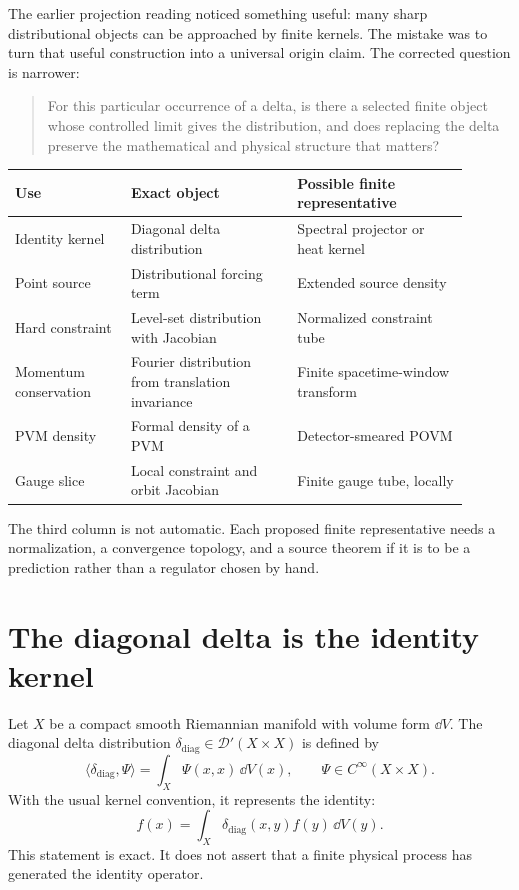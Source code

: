 \documentclass[11pt]{article}
\newcommand{\Dcal}{\mathcal D}
\begin{document}
The earlier projection reading noticed something useful: many sharp
distributional objects can be approached by finite kernels. The mistake was
to turn that useful construction into a universal origin claim. The corrected
question is narrower:
\begin{quote}
For this particular occurrence of a delta, is there a selected finite object
whose controlled limit gives the distribution, and does replacing the delta
preserve the mathematical and physical structure that matters?
\end{quote}

\begin{center}
\begin{tabular}{p{0.23\linewidth}p{0.33\linewidth}p{0.34\linewidth}}
\toprule
Use & Exact object & Possible finite representative\\
\midrule
Identity kernel &
Diagonal delta distribution &
Spectral projector or heat kernel\\
Point source &
Distributional forcing term &
Extended source density\\
Hard constraint &
Level-set distribution with Jacobian &
Normalized constraint tube\\
Momentum conservation &
Fourier distribution from translation invariance &
Finite spacetime-window transform\\
PVM density &
Formal density of a PVM &
Detector-smeared POVM\\
Gauge slice &
Local constraint and orbit Jacobian &
Finite gauge tube, locally\\
\bottomrule
\end{tabular}
\end{center}

The third column is not automatic. Each proposed finite representative needs a
normalization, a convergence topology, and a source theorem if it is to be a
prediction rather than a regulator chosen by hand.

\section{The diagonal delta is the identity kernel}

Let \(X\) be a compact smooth Riemannian manifold with volume form
\(\dd V\). The diagonal delta distribution
\(\delta_{\mathrm{diag}}\in\Dcal'(X\times X)\) is defined by
\[
\langle\delta_{\mathrm{diag}},\Psi\rangle
=\int_X\Psi(x,x)\,\dd V(x),
\qquad \Psi\in C^\infty(X\times X).
\]
With the usual kernel convention, it represents the identity:
\[
f(x)=\int_X\delta_{\mathrm{diag}}(x,y)f(y)\,\dd V(y).
\]
This statement is exact. It does not assert that a finite physical process has
generated the identity operator.
\end{document}
